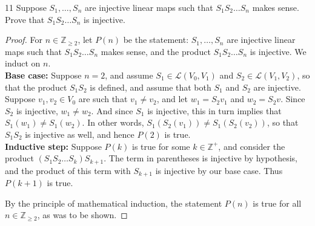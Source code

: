 \documentclass[11pt]{extarticle}
\newenvironment{problem}[1]{\begin{prob*}{#1}{}}{\end{prob*}}
\newcommand{\Z}{\mathbb{Z}}
\newcommand{\Hom}{\mathcal{L}}
\begin{document}
\begin{problem}{11}
Suppose $S_1,\dots,S_n$ are injective linear maps such that $S_1S_2\dots S_n$ makes sense.  Prove that $S_1S_2\dots S_n$ is injective.
\end{problem}
\begin{proof}
For $n\in\Z_{\geq 2}$, let $P(n)$ be the statement: $S_1,\dots, S_n$ are injective linear maps such that $S_1S_2\dots S_n$ makes sense, and the product $S_1S_2\dots S_n$ is injective.  We induct on $n$.\\
\textbf{Base case:} Suppose $n =2$, and assume $S_1\in\Hom(V_0,V_1)$ and $S_2\in\Hom(V_1,V_2)$, so that the product $S_1S_2$ is defined, and assume that both $S_1$ and $S_2$ are injective.  Suppose $v_1,v_2\in V_0$ are such that $v_1\neq v_2$, and let $w_1 = S_2v_1$ and $w_2 = S_2v$.  Since $S_2$ is injective, $w_1\neq w_2$.  And since $S_1$ is injective, this in turn implies that $S_1(w_1)\neq S_1(w_2)$.  In other words, $S_1(S_2(v_1)) \neq S_1(S_2(v_2))$, so that $S_1S_2$ is injective as well, and hence $P(2)$ is true.\\
\textbf{Inductive step:} Suppose $P(k)$ is true for some $k\in\Z^+$, and consider the product $(S_1S_2\dots S_{k})S_{k+1}$.  The term in parentheses is injective by hypothesis, and the product of this term with $S_{k+1}$ is injective by our base case.  Thus $P(k+1)$ is true.
\par By the principle of mathematical induction, the statement $P(n)$ is true for all $n\in\Z_{\geq 2}$, as was to be shown.
\end{proof}
\end{document}
